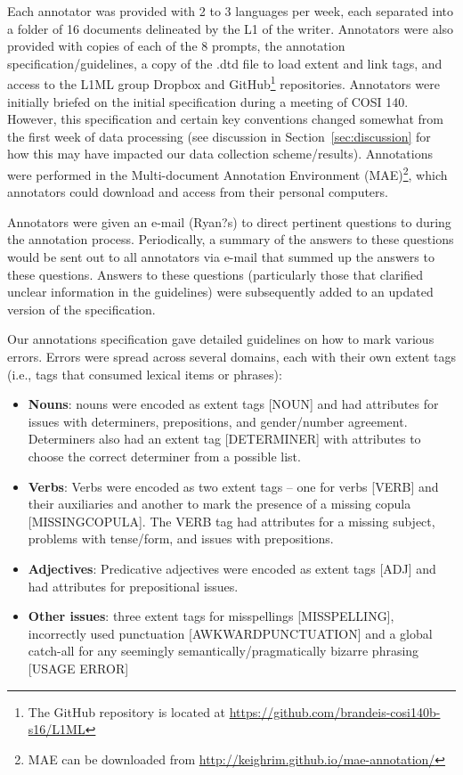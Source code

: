 \documentclass[10pt, a4paper]{article}
\begin{document}
Each annotator was provided with 2 to 3 languages per week, each separated into a folder of 16 documents delineated by the L1 of the writer. Annotators were also provided with copies of each of the 8 prompts, the annotation specification/guidelines, a copy of the .dtd file to load extent and link tags, and access to the L1ML group Dropbox and GitHub\footnote{The GitHub repository is located at \url{https://github.com/brandeis-cosi140b-s16/L1ML}} repositories. 
Annotators were initially briefed on the initial specification during a meeting of COSI 140. However, this specification and certain key conventions changed somewhat from the first week of data processing (see discussion in Section~\ref{sec:discussion} for how this may have impacted our data collection scheme/results). Annotations were performed in the Multi-document Annotation Environment (MAE)\footnote{MAE can be downloaded from \url{http://keighrim.github.io/mae-annotation/}}, which annotators could download and access from their personal computers. 

Annotators were given an e-mail (Ryan?s) to direct pertinent questions to during the annotation process. Periodically, a summary of the answers to these questions would be sent out to all annotators via e-mail that summed up the answers to these questions. Answers to these questions (particularly those that clarified unclear information in the guidelines) were subsequently added to an updated version of the specification.

Our annotations specification gave detailed guidelines on how to mark various errors. Errors were spread across several domains, each with their own extent tags (i.e., tags that consumed lexical items or phrases):

\begin{itemize}
	\item \textbf{Nouns}: nouns were encoded as extent tags [NOUN] and had attributes for issues with determiners, prepositions, and gender/number agreement. Determiners also had an extent tag [DETERMINER] with attributes to choose the correct determiner from a possible list.  
	\item \textbf{Verbs}: Verbs were encoded as two extent tags -- one for verbs [VERB] and their auxiliaries and another to mark the presence of a missing copula [MISSINGCOPULA]. The VERB tag had attributes for a missing subject, problems with tense/form, and issues with prepositions. 
	\item \textbf{Adjectives}: Predicative adjectives were encoded as extent tags [ADJ] and had attributes for prepositional issues.
	\item \textbf{Other issues}: three extent tags for misspellings [MISSPELLING], incorrectly used punctuation [AWKWARDPUNCTUATION] and a global catch-all for any seemingly semantically/pragmatically bizarre phrasing [USAGE ERROR]
\end{itemize}
\end{document}
